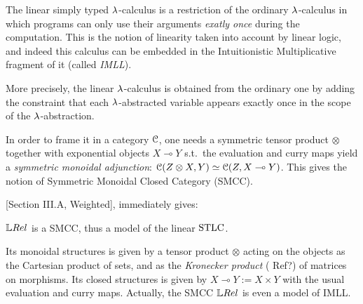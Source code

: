The linear simply typed $\lambda$-calculus is a restriction of the ordinary $\lambda$-calculus in which programs can only use their arguments \emph{exatly once} during the computation.
This is the notion of linearity taken into account by linear logic, and indeed this calculus can be embedded in the Intuitionistic Multiplicative fragment of it (called \emph{IMLL}).

More precisely, the linear $\lambda$-calculus is obtained from the ordinary one by adding the constraint that each $\lambda$-abstracted variable appears exactly once in the scope of the $\lambda$-abstraction.

In order to frame it in a category $\mathcal{C}$, one needs a symmetric tensor product $\otimes$ together with exponential objects $X\multimap Y$ s.t.\ the evaluation and curry maps yield a \emph{symmetric monoidal adjunction}: $\mathcal{C}(Z\otimes X, Y) \simeq \mathcal{C} (Z, X\multimap Y)$.
This gives the notion of Symmetric Monoidal Closed Category (SMCC).

[Section III.A, Weighted], immediately gives:

\begin{fact}\label{fact:LREL_SMCC}
 $\LREL$ is a SMCC, thus a model of the linear $\mathrm{STLC}$.
\end{fact}

Its monoidal structures is given by a tensor product $\otimes$ acting on the objects as the Cartesian product of sets, and as the \emph{Kronecker product} {(\color{red} Ref?)} of matrices on morphisms.
Its closed structures is given by $X\multimap Y:=X\times Y$ with the usual evaluation and curry maps.
Actually, the SMCC $\LREL$ is even a model of IMLL.
